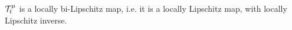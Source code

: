 \begin{proposition}\label{p-transportlip}
$\mathcal{T}^\mu_t$ is a locally bi-Lipschitz map, i.e. it is a locally Lipschitz map, with locally Lipschitz inverse.
\end{proposition}
%	
%	



